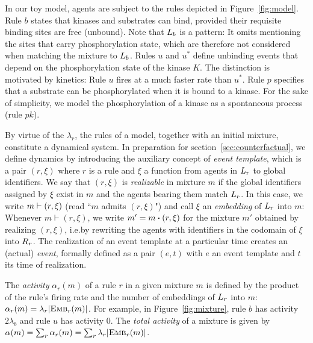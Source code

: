 

In our toy model, agents are subject to the rules depicted in
Figure~\ref{fig:model}. Rule $b$ states that kinases and substrates
can bind, provided their requisite binding sites are free
(unbound). Note that $L_{b}$ is a pattern: It omits mentioning the
sites that carry phosphorylation state, which are therefore not
considered when matching the mixture to $L_{b}$. Rules $u$ and
$u^{*}$ define unbinding events that depend on the phosphorylation
state of the kinase $K$. The distinction is motivated by kinetics:
Rule $u$ fires at a much faster rate than $u^{*}$. Rule $p$ specifies
that a substrate can be phosphorylated when it is bound to a
kinase. For the sake of simplicity, we model the phosphorylation of a
kinase as a spontaneous process (rule $pk$).

By virtue of the $\lambda_r$, the rules of a model, together with an
initial mixture, constitute a dynamical system.  In preparation for
section~\ref{sec:counterfactual}, we define dynamics by introducing the
auxiliary concept of \emph{event template}, which is a pair $(r, \xi)$
where $r$ is a rule and $\xi$ a function from agents in $L_{r}$ to
global identifiers. We say that $(r, \xi)$ is \emph{realizable} in
mixture $m$ if the global identifiers assigned by $\xi$ exist in $m$
and the agents bearing them match $L_{r}$. In this case, we write
$m \vdash (r, \xi)$ (read ``$m$ admits $(r, \xi)$") and call
$\xi$ an \emph{embedding} of $L_{r}$ into $m$:
  Whenever $m \vdash (r, \xi)$, we write
$m'=\UPDATE{m}{(r, \xi)}$ for the mixture $m'$ obtained by realizing
$(r, \xi)$, i.e.\@ by rewriting the agents with identifiers in the
codomain of $\xi$ into $R_{r}$. The realization of an event
template at a particular time creates an (actual) \emph{event},
formally defined as a pair $(e, t)$ with $e$ an event template and $t$
its time of realization.

The \emph{activity} $\alpha_r(m)$ of a rule $r$ in a given mixture $m$
is defined by the product of the rule's firing rate and the number of
embeddings of $L_{r}$ into $m$:
$\alpha_r(m)=\lambda_r|{\textsc{Emb}}_{r}(m)|$. For example, in
Figure~\ref{fig:mixture}, rule $b$ has activity $2\lambda_b$ and rule
$u$ has activity $0$. The \emph{total activity} of a mixture is given
by $\alpha(m)=\sum_r\alpha_r(m)=\sum_r\lambda_r|{\textsc{Emb}}_{r}(m)|$.

